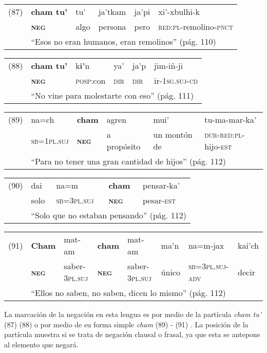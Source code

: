 {\setmainfont{Charis SIL} 

\begin{tabular}{llllll}
(87) & \textbf{cham tu’} & tu’ & ja’tkam & ja’pi & xi’-xbulhi-k  \\
& \textsc{\textbf{neg}} & algo & persona & pero & \textsc{red:pl}-remolino-\textsc{pnct}\\
& \multicolumn{5}{l}{``Esos no eran humanos, eran remolinos'' (pág. 110)}
\end{tabular} \vspace{0.5cm}

\begin{tabular}{llllll}
(88) & \textbf{cham tu’} & kɨʼn & ya’ & ja’p & jim-iñ-ji \\
& \textsc{\textbf{neg}} & \textsc{posp}:con & \textsc{dir} & \textsc{dir} & ir-\textsc{1sg.suj-cd} \\
& \multicolumn{5}{l}{``No vine para molestarte con eso'' (pág. 111)}
\end{tabular} \vspace{0.5cm}

\begin{tabular}{llllll}
(89) & na=ch & \textbf{cham} & agren & mui’ & tu-ma-mar-ka’ \\
& \textsc{sb=1pl.suj} & \textsc{\textbf{neg}} & a propósito & un montón de & \textsc{dur-red:pl}-hijo-\textsc{est} \\
& \multicolumn{5}{l}{``Para no tener una gran cantidad de hijos'' (pág. 112)}
\end{tabular} \vspace{0.5cm}

\begin{tabular}{lllll}
(90) & dai & na=m & \textbf{cham} & pensar-ka’ \\
& solo & \textsc{sb=3pl.suj} & \textsc{\textbf{neg}} & pesar-\textsc{est} \\
& \multicolumn{4}{l}{``Solo que no estaban pensando'' (pág. 112)}
\end{tabular} \vspace{0.5cm}

{\small
\begin{tabular}{llllllll}
(91) & \textbf{Cham} & mat-am & \textbf{cham} & mat-am & ma’n & na=m-jax & kai’ch \\
& \textsc{\textbf{neg}} & saber-\textsc{3pl.suj} & \textsc{\textbf{neg}} & saber-\textsc{3pl.suj} & único & \textsc{sb=3pl.suj-adv} & decir \\
& \multicolumn{7}{l}{``Ellos no saben, no saben, dicen lo mismo'' (pág. 112)}
\end{tabular} \vspace{0.5cm} }

}

La marcación de la negación en esta lengua es por medio de la partícula {\setmainfont{Charis SIL} \textit{cham tu’}} (87) (88) o por medio de su forma simple {\setmainfont{Charis SIL} \textit{cham}} (89) - (91) \textcolor{MidnightBlue}{\citep{Tepehuano}}. La posición de la partícula muestra si se trata de negación clausal o frasal, ya que esta se antepone al elemento que negará.